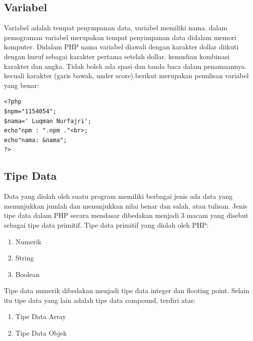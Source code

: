 \subsection{Variabel}
Variabel adalah tempat penympanan data, variabel memiliki nama. dalam pemograman variabel merupakan tempat penyimpanan data didalam memori komputer. Didalam PHP nama variabel diawali dengan karakter dollar diikuti dengan huruf sebagai karakter pertama setelah dollar. kemudian kombinasi karakter dan angka. Tidak boleh ada spasi dan tanda baca dalam penamaannya. kecuali karakter (garis bawah, under score).berikut merupakan penulisan variabel yang benar:

\begin{lstlisting}
<?php
$npm="1154054";
$nama=' Luqman Nurfajri';
echo"npm : ".npm ."<br>;
echo"nama: &nama";
?>
\end{lstlisting}

\subsection{Tipe Data}
Data yang diolah oleh suatu program memiliki berbagai jenis ada data yang menunjukkan jumlah dan menunjukkan nilai benar dan salah, atau tulisan. Jenis tipe data dalam PHP secara mendasar dibedakan menjadi 3 macam yang disebut sebagai tipe data primitif. Tipe data primitif yang diolah oleh PHP:
\begin{enumerate}
\item Numerik
\item String
\item Boolean
\end{enumerate}
Tipe data numerik dibedakan menjadi tipe data integer dan flooting point. Selain itu tipe data yang lain adalah tipe data compound, terdiri atas:
\begin{enumerate}
\item Tipe Data Array
\item Tipe Data Objek 
\end{enumerate}

